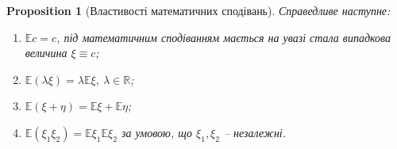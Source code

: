 \documentclass[a4paper, 10pt]{article}
\theoremstyle{theoremdd}
\newtheorem{proposition}[theorem]{Proposition}
\begin{document}
\begin{proposition}[Властивості математичних сподівань]
Справедливе наступне:
\begin{enumerate}[nosep,wide=0pt,label={\arabic*)}]
\item $\mathbb{E}c = c$, під математичним сподіванням мається на увазі стала випадкова величина $\xi \equiv c$;
\item $\mathbb{E}(\lambda \xi) = \lambda \mathbb{E} \xi,\ \lambda \in \mathbb{R}$;
\item $\mathbb{E}(\xi + \eta) = \mathbb{E}\xi + \mathbb{E}\eta$;
\item $\mathbb{E}(\xi_1 \xi_2) = \mathbb{E} \xi_1 \mathbb{E} \xi_2$ за умовою, що $\xi_1,\xi_2$ -- незалежні.
\end{enumerate}
\end{proposition}
\end{document}
